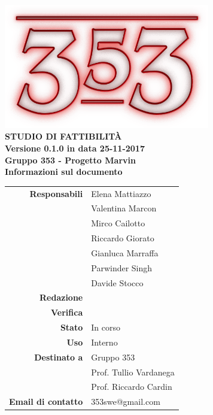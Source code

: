 \documentclass[openany, a4paper, 12pt]{report}
\begin{document}
\begin{titlepage}
	\centering
	\vfill
	{
		\bfseries
		\vskip2cm
		\includegraphics[width=9cm]{../../common/images/logo.png} \\
		\vfill
		\Huge{STUDIO DI FATTIBILITÀ}\\
		\vfill
		\Large Versione 0.1.0 in data 25-11-2017\\
		\large Gruppo 353 - Progetto Marvin\\
		\vfill
	\normalsize Informazioni sul documento\\
\begin{table}[htbp]
	\centering
	\renewcommand\arraystretch{1.2}
	\begin{tabular}{r|l}
		\hline
		\textbf{Responsabili}	& Elena Mattiazzo\\
								& Valentina Marcon\\
								& Mirco Cailotto\\
								& Riccardo Giorato\\
								& Gianluca Marraffa\\
								& Parwinder Singh\\
								& Davide Stocco\\
		
		\textbf{Redazione} 	& \\
		\textbf{Verifica} 	& \\	
						
		\textbf{Stato} 			& In corso\\
		\textbf{Uso}			& Interno\\
		\textbf{Destinato a}   	& Gruppo 353\\
								& Prof. Tullio Vardanega\\
								& Prof. Riccardo Cardin\\
		
		\textbf{Email di contatto}	& 353swe@gmail.com
	\end{tabular}
\end{table}
		\vfill
	}    
\end{titlepage}

\tableofcontents
\newpage
{}

%
%
%
%
%
%
%

 
\end{document}
